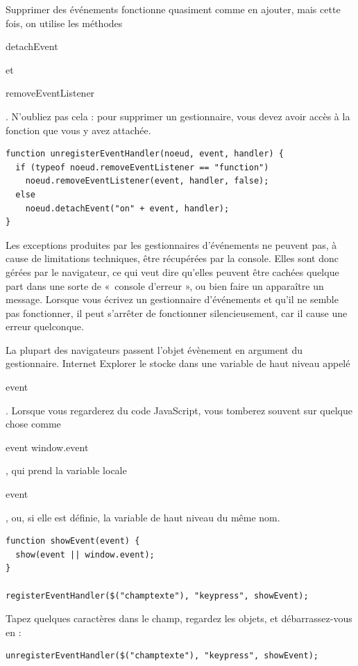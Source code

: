 \documentclass{FramateX}
\renewcommand{\texttt}[1]{\begin{sffamily}{#1}\end{sffamily}}
\begin{document}
Supprimer des événements fonctionne quasiment comme en ajouter, mais
cette fois, on utilise les méthodes \texttt{detachEvent} et
\texttt{removeEventListener}. N'oubliez pas cela : pour supprimer un
gestionnaire, vous devez avoir accès à la fonction que vous y avez
attachée.

\begin{lstlisting}
function unregisterEventHandler(noeud, event, handler) {
  if (typeof noeud.removeEventListener == "function")
    noeud.removeEventListener(event, handler, false);
  else
    noeud.detachEvent("on" + event, handler);
}
\end{lstlisting}
\begin{center}\end{center}

Les exceptions produites par les gestionnaires d'événements ne peuvent
pas, à cause de limitations techniques, être récupérées par la console.
Elles sont donc gérées par le navigateur, ce qui veut dire qu'elles
peuvent être cachées quelque part dans une sorte de «~console d'erreur
», ou bien faire un apparaître un message. Lorsque vous écrivez un
gestionnaire d'événements et qu'il ne semble pas fonctionner, il peut
s'arrêter de fonctionner silencieusement, car il cause une erreur
quelconque.

\begin{center}\end{center}

La plupart des navigateurs passent l'objet évènement en argument du
gestionnaire. Internet Explorer le stocke dans une variable de haut
niveau appelé \texttt{event}. Lorsque vous regarderez du code
JavaScript, vous tomberez souvent sur quelque chose comme
\texttt{event \textbar{}\textbar{} window.event}, qui prend la variable
locale \texttt{event}, ou, si elle est définie, la variable de haut
niveau du même nom.

\begin{lstlisting}
function showEvent(event) {
  show(event || window.event);
}

registerEventHandler($("champtexte"), "keypress", showEvent);
\end{lstlisting}
Tapez quelques caractères dans le champ, regardez les objets, et
débarrassez-vous en :

\begin{lstlisting}
unregisterEventHandler($("champtexte"), "keypress", showEvent);
\end{lstlisting}
\begin{center}\end{center}
\end{document}
